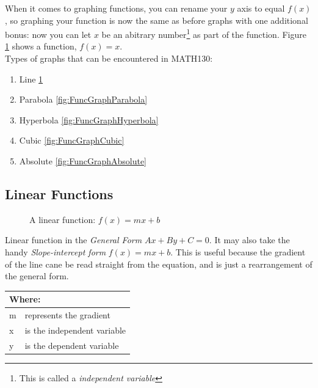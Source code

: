 When it comes to graphing functions, you can rename your $y$ axis to equal
$f(x)$, so graphing your function is now the same as before graphs with one
additional bonus: now you can let $x$ be an abitrary number\footnote{This is
called a \emph{independent variable}} as part of the function. Figure
\ref{fig:FuncGraphLinear} shows a function, $f(x) = {x}$.\\
Types of graphs that can be encountered in MATH130:\\
\begin{enumerate}
  \item Line \ref{fig:FuncGraphLinear}
  \item Parabola \ref{fig:FuncGraphParabola}
  \item Hyperbola \ref{fig:FuncGraphHyperbola}
  \item Cubic \ref{fig:FuncGraphCubic}
  \item Absolute \ref{fig:FuncGraphAbsolute}
\end{enumerate}
%
\clearpage
\subsection{Linear Functions}
\label{Sec:LinearFunctions}
\begin{figure}[!hbt]
\label{fig:FuncGraphLinear}
\caption{A linear function: $f(x) = mx + b$}
\end{figure}
%
Linear function in the \emph{General Form} $Ax + By + C= 0$. It may also take
the handy \emph{Slope-intercept form} $ f(x) = mx + b $. This is useful because
the gradient of the line cane be read straight from the equation, and is just
a rearrangement of the general form. 
\begin{table}[!hbt]
\label{tab:PartsOfALinearFunction}
\begin{tabularx}{\linewidth}{| l X |}
  \hline
  \multicolumn{2}{|l|}{Where:} \\
  \hline \hline
  m & represents the gradient\\
  x & is the independent variable\\
  y & is the dependent variable\\
\hline
\end{tabularx}
\end{table}
%
\clearpage
